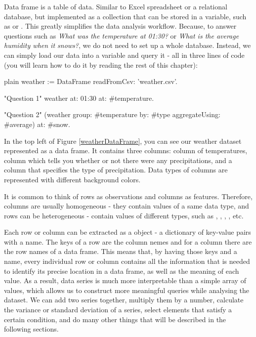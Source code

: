 \documentclass[10pt,twoside,english]{_support/latex/sbabook/sbabook}
\begin{document}
Data frame is a table of data. Similar to Excel spreadsheet or a relational database, but implemented as a collection that can be stored in a variable, such as  or . This greatly simplifies the data analysis workflow. Because, to answer questions such as \textit{What was the temperature at 01:30?} or \textit{What is the average humidity when it snows?}, we do not need to set up a whole database. Instead, we can simply load our data into a variable and query it - all in three lines of code (you will learn how to do it by reading the rest of this chapter):

\begin{displaycode}{plain}
weather := DataFrame readFromCsv: 'weather.csv'.

"Question 1"
weather at: 01:30 at: #temperature.

"Question 2"
(weather group: #temperature by: #type aggregateUsing: #average) at: #snow.
\end{displaycode}

In the top left of Figure \ref{weatherDataFrame}, you can see our weather dataset represented as a data frame. It contains three columns:  column of temperatures,  column which tells you whether or not there were any precipitations, and a  column that specifies the type of precipitation. Data types of columns are represented with different background colors.

It is common to think of rows as observations and columns as features. Therefore, columns are usually homogeneous - they contain values of a same data type, and rows can be heterogeneous - contain values of different types, such as , , , , etc.

Each row or column can be extracted as a  object - a dictionary of key-value pairs with a name. The keys of a row are the column nemes and for a column there are the row names of a data frame. This means that, by having those keys and a name, every individual row or column contains all the information that is needed to identify its precise location in a data frame, as well as the meaning of each value. As a result, data series is much more interpretable than a simple array of values, which allows us to construct more meaningful queries while analysing the dataset. We can add two series together, multiply them by a number, calculate the variance or standard deviation of a series, select elements that satisfy a certain condition, and do many other things that will be described in the following sections.
\end{document}

